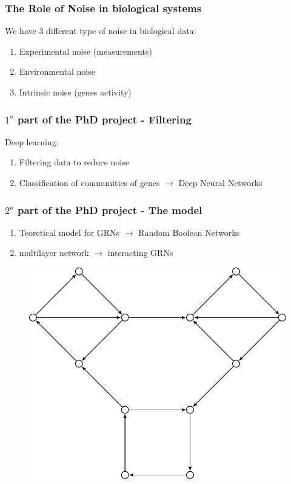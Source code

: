 \documentclass{beamer}
\begin{document}
\begin{frame}
\frametitle{The Role of Noise in biological systems}
We have 3 different type of noise in biological data:
\begin{enumerate}
\item Experimental noise (measurements)
\item Environmental noise 
\item Intrinsic noise (genes activity)
\end{enumerate}
\end{frame}

\begin{frame}
\frametitle{$1^o$ part of the PhD project - Filtering}
Deep learning:
\begin{enumerate}
\item Filtering data to reduce noise
\item Classification of communities of genes $\to$ Deep Neural Networks
\end{enumerate}
\end{frame}

\begin{frame}
\frametitle{$2^o$ part of the PhD project - The model}
\begin{enumerate}
\item Teoretical model for GRNs $\to$  Random Boolean Networks
\item multilayer network $\to$ interacting GRNs 

\end{enumerate}
\begin{figure}
\includegraphics[scale = 0.5]{grn1.pdf}
\end{figure}
\end{frame}
\end{document}
